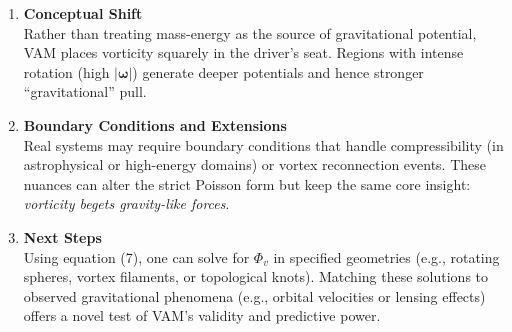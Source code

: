 \begin{enumerate}
    \item \textbf{Conceptual Shift} \\
    Rather than treating mass-energy as the source of gravitational potential, VAM places vorticity squarely in the driver’s seat. Regions with intense rotation (high \(|\boldsymbol{\omega}|\)) generate deeper potentials and hence stronger “gravitational” pull.
    \item \textbf{Boundary Conditions and Extensions} \\
    Real systems may require boundary conditions that handle compressibility (in astrophysical or high-energy domains) or vortex reconnection events. These nuances can alter the strict Poisson form but keep the same core insight: \textit{vorticity begets gravity-like forces}.
    \item \textbf{Next Steps} \\
    Using equation (7), one can solve for \(\Phi_v\) in specified geometries (e.g., rotating spheres, vortex filaments, or topological knots). Matching these solutions to observed gravitational phenomena (e.g., orbital velocities or lensing effects) offers a novel test of VAM’s validity and predictive power.
\end{enumerate}
